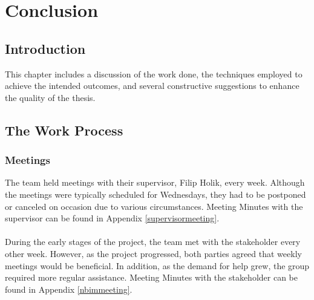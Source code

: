 \newpage
\thispagestyle{empty}
\mbox{}

\chapter{Conclusion}
\section{Introduction}
This chapter includes a discussion of the work done, the techniques employed to achieve the intended outcomes, and several constructive suggestions to enhance the quality of the thesis.



\section{The Work Process}

\subsection{Meetings}
The team held meetings with their supervisor, Filip Holik, every week. Although the meetings were typically scheduled for Wednesdays, they had to be postponed or canceled on occasion due to various circumstances. Meeting Minutes with the supervisor can be found in Appendix \ref{supervisormeeting}.
\\~\\
During the early stages of the project, the team met with the stakeholder every other week. However, as the project progressed, both parties agreed that weekly meetings would be beneficial. In addition, as the demand for help grew, the group required more regular assistance. Meeting Minutes with the stakeholder can be found in Appendix \ref{nbimmeeting}.  

